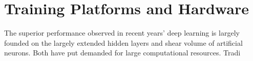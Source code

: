 \section{Training Platforms and Hardware}
The superior performance observed in recent years' deep learning is largely founded on the largely extended hidden layers and shear volume of artificial neurons. Both have put demanded for large computational resources. Tradi